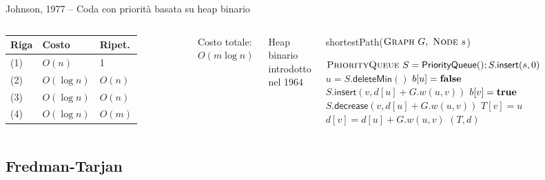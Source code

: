 \begin{frame}{Johnson, 1977 -- Coda con priorità basata su heap binario}



\begin{columns}

\begingroup
\renewcommand*{\arraystretch}{1.2}
\begin{tabular}{|l|l|l|}
\hline
Riga & Costo & Ripet. \\\hline
(1) & $O(n)$ & 1 \\\hline
(2) & $O(\log n)$ & $O(n)$ \\\hline
(3) & $O(\log n)$ & $O(n)$ \\\hline
(4) & $O(\log n)$ & $O(m)$ \\\hline
\end{tabular}
\endgroup

\medskip
Costo totale: \alert{$O(m \log n)$}

\medskip
Heap binario introdotto nel 1964

\vspace{-12pt}
\tiny
\begin{Procedure}
\caption[A]{\textsf{shortestPath}($\textsc{Graph}\ G,\ \textsc{Node}\ s$)}
\alert{$\textsc{PriorityQueue}\ S = \textsf{PriorityQueue}(); S.\textsf{insert}(s, 0)$}\;
{
  \alert{$u = S.\textsf{deleteMin}()$}\;
  $b[u] = \FALSE$\;
  {
    {
      {
        \alert{$S.\textsf{insert}(v, d[u]+G.w(u,v))$}\;
        $b[v] = \TRUE$\;
      }
      {
        \alert{$S.\textsf{decrease}(v, d[u]+G.w(u,v))$}
      }
      $T[v] = u$\;
      $d[v] = d[u] + G.w(u,v)$\;
    }
  }
}
\Return $(T,d)$
\end{Procedure}
\end{columns}



\end{frame}

\subsection{Fredman-Tarjan}


